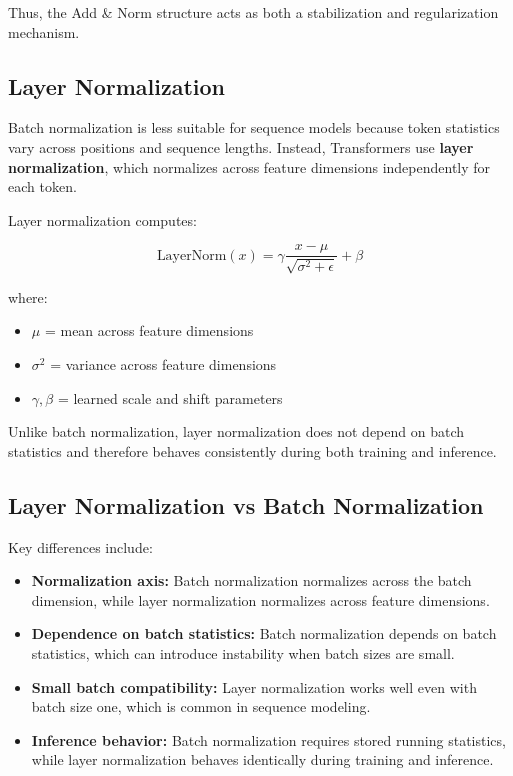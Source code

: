 \documentclass[11pt]{article}
\begin{document}
Thus, the Add \& Norm structure acts as both a stabilization and regularization mechanism.

\subsection{Layer Normalization}

Batch normalization is less suitable for sequence models because token statistics vary across positions and sequence lengths. Instead, Transformers use \textbf{layer normalization}, which normalizes across feature dimensions independently for each token.

Layer normalization computes:

\[
\text{LayerNorm}(x)
=
\gamma
\frac{x - \mu}{\sqrt{\sigma^2 + \epsilon}}
+
\beta
\]

where:

\begin{itemize}[nosep]

\item $\mu$ = mean across feature dimensions
\item $\sigma^2$ = variance across feature dimensions
\item $\gamma,\beta$ = learned scale and shift parameters

\end{itemize}

Unlike batch normalization, layer normalization does not depend on batch statistics and therefore behaves consistently during both training and inference.

\subsection{Layer Normalization vs Batch Normalization}

Key differences include:

\begin{itemize}

\item \textbf{Normalization axis:}  
Batch normalization normalizes across the batch dimension, while layer normalization normalizes across feature dimensions.

\item \textbf{Dependence on batch statistics:}  
Batch normalization depends on batch statistics, which can introduce instability when batch sizes are small.

\item \textbf{Small batch compatibility:}  
Layer normalization works well even with batch size one, which is common in sequence modeling.

\item \textbf{Inference behavior:}  
Batch normalization requires stored running statistics, while layer normalization behaves identically during training and inference.

\end{itemize}
\end{document}
